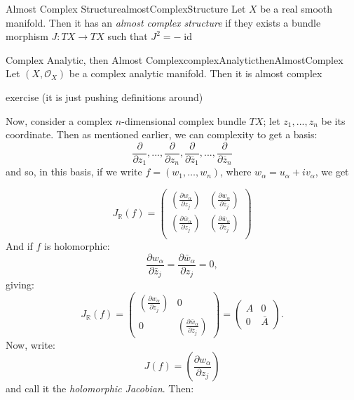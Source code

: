\documentclass{book}
\newcommand{\CO}{{\mathcal{O}}}
\newcommand{\id}{{\operatorname{id}}}
\begin{document}
\begin{defn}{Almost Complex Structure}{almostComplexStructure}
  Let $X$ be a real smooth manifold. Then it has an \emph{almost complex structure} if they exists a bundle
  morphism $J : TX \to TX$ such that $J^2 = -\id$
\end{defn}

\begin{prop}{Complex Analytic, then Almost Complex}{complexAnalyticthenAlmostComplex}
  Let $(X, \CO_X)$ be a complex analytic manifold. Then it is almost complex
\end{prop}

\begin{Proof}
  exercise (it is just pushing definitions around)
\end{Proof}


Now, consider a complex $n$-dimensional complex bundle $TX$; let $z_1, ..., z_n$ be its coordinate. Then as
mentioned earlier, we can complexity to get a basis:
\[
  \frac{\partial }{\partial z_1}, ..., \frac{\partial }{\partial z_n}, \frac{\partial }{\partial
  \overline{z}_1}, ..., \frac{\partial }{\partial \overline{z}_n}
\]
and so, in this basis, if we write $f=(w_1,\ldots,w_n)$, where $w_\alpha = u_\alpha + iv_\alpha$, we get

\[
J_\mathbb{R}(f) = \begin{pmatrix}
  \left(\frac{\partial w_\alpha}{\partial z_j}\right) & \left(\frac{\partial w_\alpha}{\partial \overline{z}_j}\right)\\
  \left(\frac{\partial \overline{w}_\alpha}{\partial z_j}\right) & \left(\frac{\partial
  \overline{w}_\alpha}{\partial \overline{z}_j}\right)\\
\end{pmatrix}
\]
And if $f$ is holomorphic:
\[
\frac{\partial w_\alpha}{\partial \bar{z}_j} = \frac{\partial \bar{w}_\alpha}{\partial z_j} = 0,
\]
giving:
\[
  J_\mathbb{R}(f) = \begin{pmatrix}\left(\frac{\partial w_\alpha}{\partial z_j}\right) & 0 \\
    0 &\left(\frac{\partial \bar{w}_\alpha}{\partial \bar{z}_j}\right)\end{pmatrix} =
    \begin{pmatrix}A &  0 \\
    0 & \bar{A}\end{pmatrix}.
\]
Now, write:
\[
J(f) = \left(\frac{\partial w_\alpha}{\partial z_j}\right)
\]
and call it the \textit{holomorphic Jacobian}. Then:
\end{document}
